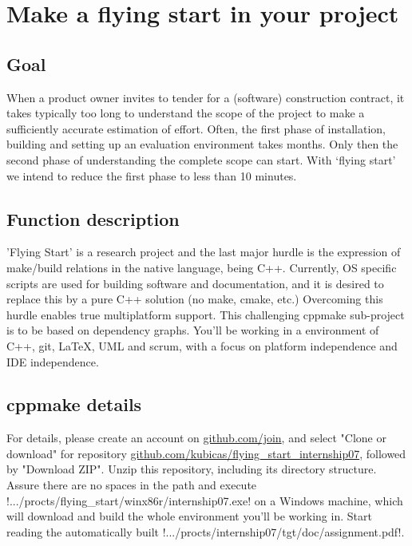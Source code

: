 \chapter*{Make a flying start in your project}
\section*{Goal}
When a product owner invites to tender for a (software) construction contract,
it takes typically too long to understand the scope of the project to make a
sufficiently accurate estimation of effort. Often, the first phase of 
installation, building and setting up an evaluation environment takes months.
Only then the second phase of understanding the complete scope can start.
With `flying start' we intend to reduce the first phase to less than 10 minutes.

\section*{Function description}
'Flying Start' is a research project and the last major hurdle is the
expression of make/build relations in the native language, being C++. Currently,
OS specific scripts are used for building software and documentation, and it is
desired to replace this by a pure C++ solution (no make, cmake, etc.) 
Overcoming this hurdle enables true multiplatform support.
This challenging cppmake sub-project is to be based on dependency graphs.
You'll be working in a environment of C++, git, LaTeX, UML and scrum, with a 
focus on platform independence and IDE independence.

\section*{cppmake details}
For details, please create an account on \url{github.com/join}, and
select "Clone or download" for repository 
\url{github.com/kubicas/flying_start_internship07}, followed by "Download ZIP".
Unzip this repository, including its directory structure. Assure there are no
spaces in the path and execute 
!.../procts/flying_start/winx86r/internship07.exe! on a Windows machine, which will 
download and build the whole environment you'll be working in. Start reading 
the automatically built
!.../procts/internship07/tgt/doc/assignment.pdf!.

